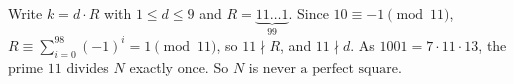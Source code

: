 Write $k=d\cdot R$ with $1\le d\le9$ and $R=\underbrace{11\ldots1}_{99}$. Since $10\equiv-1\pmod{11}$, $R\equiv\sum_{i=0}^{98}(-1)^i=1\pmod{11}$, so $11\nmid R$, and $11\nmid d$. As $1001=7\cdot11\cdot13$, the prime $11$ divides $N$ exactly once. So $N$ is $\boxed{\text{never a perfect square}}$.
